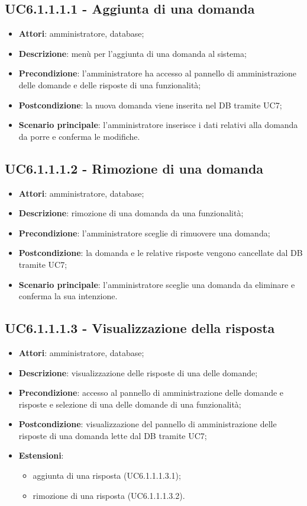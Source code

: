 \documentclass[../AnalisiDeiRequisiti.tex]{subfiles}
\begin{document}
\subsection{UC6.1.1.1.1 - Aggiunta di una domanda} 
\label{sssec:UC6.1.1.1.1} 
\begin{itemize} 
\item \textbf{Attori}: amministratore, database;
\item \textbf{Descrizione}: menù per l'aggiunta di una domanda al sistema;
\item \textbf{Precondizione}: l'amministratore ha accesso al pannello di amministrazione delle domande e delle risposte di una funzionalità;
\item \textbf{Postcondizione}: la nuova domanda viene inserita nel DB tramite UC7;
\item \textbf{Scenario principale}: l'amministratore inserisce i dati relativi alla domanda da porre e conferma le modifiche.\end{itemize} 
\subsection{UC6.1.1.1.2 - Rimozione di una domanda} 
\label{sssec:UC6.1.1.1.2} 
\begin{itemize} 
\item \textbf{Attori}: amministratore, database;
\item \textbf{Descrizione}: rimozione di una domanda da una funzionalità;
\item \textbf{Precondizione}: l'amministratore sceglie di rimuovere una domanda;
\item \textbf{Postcondizione}: la domanda e le relative risposte vengono cancellate dal DB tramite UC7;
\item \textbf{Scenario principale}: l'amministratore sceglie una domanda da eliminare e conferma la sua intenzione.\end{itemize} 
\subsection{UC6.1.1.1.3 - Visualizzazione della risposta} 
\label{sssec:UC6.1.1.1.3} 
\begin{itemize} 
\item \textbf{Attori}: amministratore, database;
\item \textbf{Descrizione}: visualizzazione delle risposte di una delle domande;
\item \textbf{Precondizione}: accesso al pannello di amministrazione delle domande e risposte e selezione di una delle domande di una funzionalità;
\item \textbf{Postcondizione}: visualizzazione del pannello di amministrazione delle risposte di una domanda lette dal DB tramite UC7;
\item \textbf{Estensioni}:\begin{itemize}\item aggiunta di una risposta (UC6.1.1.1.3.1);\item rimozione di una risposta (UC6.1.1.1.3.2).\end{itemize}
\end{itemize} 
\end{document}
